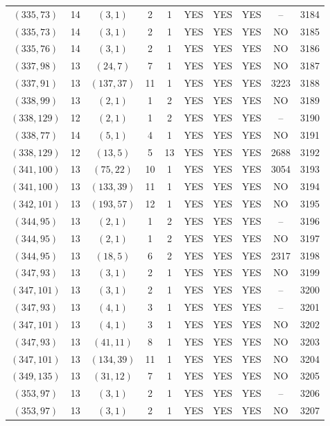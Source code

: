 \begin{longtable}{|c|c|c|c|c|c|c|c|c|c|}
$(335, 73)$ & 14 & $(3, 1)$ & 2 & 1 & YES & YES & YES & -- & 3184\\
$(335, 73)$ & 14 & $(3, 1)$ & 2 & 1 & YES & YES & YES & NO & 3185\\
$(335, 76)$ & 14 & $(3, 1)$ & 2 & 1 & YES & YES & YES & NO & 3186\\
$(337, 98)$ & 13 & $(24, 7)$ & 7 & 1 & YES & YES & YES & NO & 3187\\
$(337, 91)$ & 13 & $(137, 37)$ & 11 & 1 & YES & YES & YES & 3223 & 3188\\
$(338, 99)$ & 13 & $(2, 1)$ & 1 & 2 & YES & YES & YES & NO & 3189\\
$(338, 129)$ & 12 & $(2, 1)$ & 1 & 2 & YES & YES & YES & -- & 3190\\
$(338, 77)$ & 14 & $(5, 1)$ & 4 & 1 & YES & YES & YES & NO & 3191\\
$(338, 129)$ & 12 & $(13, 5)$ & 5 & 13 & YES & YES & YES & 2688 & 3192\\
$(341, 100)$ & 13 & $(75, 22)$ & 10 & 1 & YES & YES & YES & 3054 & 3193\\
$(341, 100)$ & 13 & $(133, 39)$ & 11 & 1 & YES & YES & YES & NO & 3194\\
$(342, 101)$ & 13 & $(193, 57)$ & 12 & 1 & YES & YES & YES & NO & 3195\\
$(344, 95)$ & 13 & $(2, 1)$ & 1 & 2 & YES & YES & YES & -- & 3196\\
$(344, 95)$ & 13 & $(2, 1)$ & 1 & 2 & YES & YES & YES & NO & 3197\\
$(344, 95)$ & 13 & $(18, 5)$ & 6 & 2 & YES & YES & YES & 2317 & 3198\\
$(347, 93)$ & 13 & $(3, 1)$ & 2 & 1 & YES & YES & YES & NO & 3199\\
$(347, 101)$ & 13 & $(3, 1)$ & 2 & 1 & YES & YES & YES & -- & 3200\\
$(347, 93)$ & 13 & $(4, 1)$ & 3 & 1 & YES & YES & YES & -- & 3201\\
$(347, 101)$ & 13 & $(4, 1)$ & 3 & 1 & YES & YES & YES & NO & 3202\\
$(347, 93)$ & 13 & $(41, 11)$ & 8 & 1 & YES & YES & YES & NO & 3203\\
$(347, 101)$ & 13 & $(134, 39)$ & 11 & 1 & YES & YES & YES & NO & 3204\\
$(349, 135)$ & 13 & $(31, 12)$ & 7 & 1 & YES & YES & YES & NO & 3205\\
$(353, 97)$ & 13 & $(3, 1)$ & 2 & 1 & YES & YES & YES & -- & 3206\\
$(353, 97)$ & 13 & $(3, 1)$ & 2 & 1 & YES & YES & YES & NO & 3207\\

\end{longtable}
